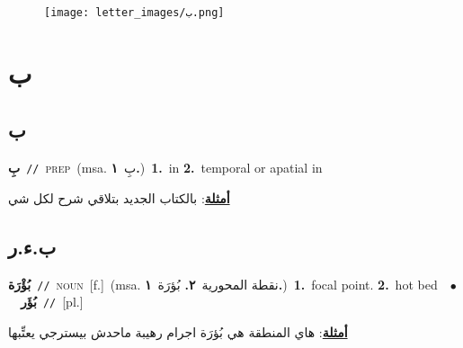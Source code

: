 \documentclass[10pt,a4paper,twoside]{article} %
\begin{document}
\begin{figure*}[t!]\centering\texttt{[image: letter\_images/ب.png]}\end{figure*}
\color{white}

 \section*{\foreignlanguage{arabic}{ب}} 
 \begin{multicols}{2} 

%
\color{black}
\vspace{-3mm}
\subsection*{\color{blue}\foreignlanguage{arabic}{ب}\color{blue}{ (ntws)}} 

{\setlength\topsep{0pt}\textbf{\foreignlanguage{arabic}{بِ}}\ {\color{gray}\texttt{//}\color{black}}\ \textsc{prep}\ \color{gray}(msa. \foreignlanguage{arabic}{بِ}~\foreignlanguage{arabic}{\textbf{١.}})\color{black}\ \textbf{1.}~in  \textbf{2.}~temporal or apatial in\  \begin{flushright}\color{gray}\foreignlanguage{arabic}{\textbf{\underline{\foreignlanguage{arabic}{أمثلة}}}: بالكتاب الجديد بتلاقي شرح لكل شي}\end{flushright}\color{black}} \vspace{2mm}

\vspace{-3mm}
\subsection*{\color{blue}\foreignlanguage{arabic}{ب.ء.ر}\color{blue}{}} 

{\setlength\topsep{0pt}\textbf{\foreignlanguage{arabic}{بُؤْرَة}}\ {\color{gray}\texttt{//}\color{black}}\ \textsc{noun}\ [f.]\ \color{gray}(msa. \foreignlanguage{arabic}{نقطة المحورية}~\foreignlanguage{arabic}{\textbf{٢.}}  \foreignlanguage{arabic}{بُؤرَة}~\foreignlanguage{arabic}{\textbf{١.}})\color{black}\ \textbf{1.}~focal point.  \textbf{2.}~hot bed\ \ $\bullet$\ \ \setlength\topsep{0pt}\textbf{\foreignlanguage{arabic}{بُؤَر}}\ {\color{gray}\texttt{//}\color{black}}\ [pl.]\  \begin{flushright}\color{gray}\foreignlanguage{arabic}{\textbf{\underline{\foreignlanguage{arabic}{أمثلة}}}: هاي المنطقة هي بُؤرَة اجرام رهيبة ماحدش بيسترجي يعتِّبها}\end{flushright}\color{black}} \vspace{2mm}


\end{multicols}
\end{document}
